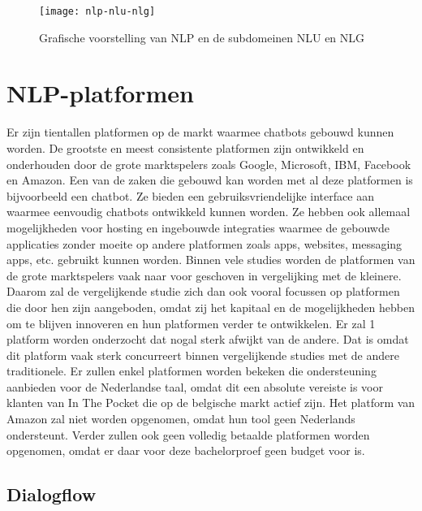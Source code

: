\begin{figure}[!htbp]
    \label{fig:nlp-nlu-nlg}
    \centering
    \texttt{[image: nlp-nlu-nlg]}
    \caption{Grafische voorstelling van NLP en de subdomeinen NLU en NLG \autocite{Sciforce2019}}
\end{figure}

\section{NLP-platformen}
\label{sec:nlp-platformen}

Er zijn tientallen platformen op de markt waarmee chatbots gebouwd kunnen worden. De grootste en meest consistente platformen zijn ontwikkeld en onderhouden door de grote marktspelers zoals Google, Microsoft, IBM, Facebook en Amazon. Een van de zaken die gebouwd kan worden met al deze platformen is bijvoorbeeld een chatbot. Ze bieden een gebruiksvriendelijke interface aan waarmee eenvoudig chatbots ontwikkeld kunnen worden. Ze hebben ook allemaal mogelijkheden voor hosting en ingebouwde integraties waarmee de gebouwde applicaties zonder moeite op andere platformen zoals apps, websites, messaging apps, etc. gebruikt kunnen worden. Binnen vele studies worden de platformen van de grote marktspelers vaak naar voor geschoven in vergelijking met de kleinere. Daarom zal de vergelijkende studie zich dan ook vooral focussen op platformen die door hen zijn aangeboden, omdat zij het kapitaal en de mogelijkheden hebben om te blijven innoveren en hun platformen verder te ontwikkelen. Er zal 1 platform worden onderzocht dat nogal sterk afwijkt van de andere. Dat is omdat dit platform vaak sterk concurreert binnen vergelijkende studies met de andere traditionele. Er zullen enkel platformen worden bekeken die ondersteuning aanbieden voor de Nederlandse taal, omdat dit een absolute vereiste is voor klanten van In The Pocket die op de belgische markt actief zijn. Het platform van Amazon zal niet worden opgenomen, omdat hun tool geen Nederlands ondersteunt. Verder zullen ook geen volledig betaalde platformen worden opgenomen, omdat er daar voor deze bachelorproef geen budget voor is.

\subsection{Dialogflow}
\label{subsec:nlp-platformen-dialogflow}

